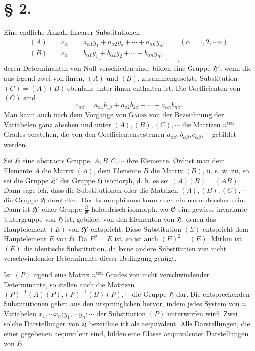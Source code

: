 \documentclass[11pt]{article}
\newcommand{\Hgrp}{\mathfrak{H}}
\newcommand{\Ggrp}{\mathfrak{G}}
\newcommand{\ten}{\mathrm{ten}}
\begin{document}
\section*{§ 2.}

Eine endliche Anzahl linearer Substitutionen
\begin{align*}
(A)\qquad x_\alpha&=a_{\alpha1}y_1+a_{\alpha2}y_2+\cdots+a_{\alpha n}y_n,\qquad (\alpha=1,2,\cdots n)\\
(B)\qquad x_\alpha&=b_{\alpha1}y_1+b_{\alpha2}y_2+\cdots+b_{\alpha n}y_n,
\end{align*}
\[
\cdot\quad\cdot\quad\cdot\quad\cdot\quad\cdot\quad\cdot\quad\cdot\quad\cdot\quad\cdot\quad\cdot,
\]
deren Determinanten von Null verschieden sind, bilden eine Gruppe $\Hgrp'$, wenn die aus irgend zwei von ihnen, $(A)$ und $(B)$, zusammengesetzte Substitution $(C)=(A)(B)$ ebenfalls unter ihnen enthalten ist. Die Coefficienten von $(C)$ sind
\[
c_{\alpha\beta}=a_{\alpha1}b_{1\beta}+a_{\alpha2}b_{2\beta}+\cdots+a_{\alpha n}b_{n\beta}.
\]
Man kann auch nach dem Vorgange von \textsc{Gauss} von der Bezeichnung der Variabelen ganz absehen und unter $(A),(B),(C),\cdots$ die Matrizen $n^{\ten}$ Grades verstehen, die von den Coefficientensystemen $a_{\alpha\beta},b_{\alpha\beta},c_{\alpha\beta},\cdots$ gebildet werden.

Sei $\Hgrp$ eine abstracte Gruppe, $A,B,C,\cdots$ ihre Elemente. Ordnet man dem Elemente $A$ die Matrix $(A)$, dem Elemente $B$ die Matrix $(B)$, u. s. w. zu, so sei die Gruppe $\Hgrp'$ der Gruppe $\Hgrp$ isomorph, d. h. es sei $(A)(B)=(AB)$. Dann sage ich, dass die Substitutionen oder die Matrizen $(A),(B),(C),\cdots$ die Gruppe $\Hgrp$ darstellen. Der Isomorphismus kann auch ein meroedrischer sein. Dann ist $\Hgrp'$ einer Gruppe $\frac{\Hgrp}{\Ggrp}$ holoedrisch isomorph, wo $\Ggrp$ eine gewisse invariante Untergruppe von $\Hgrp$ ist, gebildet von den Elementen von $\Hgrp$, denen das Hauptelement $(E)$ von $\Hgrp'$ entspricht. Diese Substitution $(E)$ entspricht dem Hauptelement $E$ von $\Hgrp$. Da $E^2=E$ ist, so ist auch $(E)^2=(E)$. Mithin ist $(E)$ die identische Substitution, da keine andere Substitution von nicht verschwindender Determinante dieser Bedingung genügt.

Ist $(P)$ irgend eine Matrix $n^{\ten}$ Grades von nicht verschwindender Determinante, so stellen auch die Matrizen $(P)^{-1}(A)(P),(P)^{-1}(B)(P),\cdots$ die Gruppe $\Hgrp$ dar. Die entsprechenden Substitutionen gehen aus den ursprünglichen hervor, indem jedes System von $n$ Variabelen $x_1,\cdots x_n;y_1,\cdots y_n;\cdots$ der Substitution $(P)$ unterworfen wird. Zwei solche Darstellungen von $\Hgrp$ bezeichne ich als aequivalent. Alle Darstellungen, die einer gegebenen aequivalent sind, bilden eine Classe aequivalenter Darstellungen von $\Hgrp$.
\end{document}
